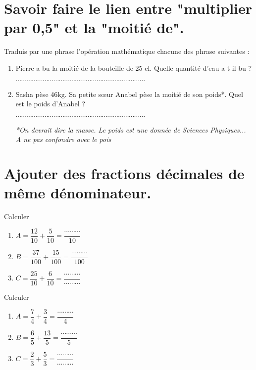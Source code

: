 \section{Savoir faire le lien entre "multiplier par 0,5" et la "moitié de".}



Traduis par une phrase l'opération mathématique chacune des phrase suivantes :
\begin{enumerate}
\item Pierre a bu la moitié de la bouteille de 25 cl. Quelle quantité d'eau a-t-il bu ?

$\cdots\cdots\cdots\cdots\cdots\cdots\cdots\cdots\cdots\cdots\cdots\cdots\cdots\cdots\cdots\cdots\cdots\cdots\cdots\cdots\cdots\cdots\cdots\cdots $

\item Sasha pèse 46kg. Sa petite sœur Anabel pèse la moitié de son poids*. Quel est le poids d'Anabel ?

$\cdots\cdots\cdots\cdots\cdots\cdots\cdots\cdots\cdots\cdots\cdots\cdots\cdots\cdots\cdots\cdots\cdots\cdots\cdots\cdots\cdots\cdots\cdots\cdots $

\textit{*On devrait dire la masse. Le poids est une donnée de Sciences Physiques... A ne pas confondre avec le pois}
\end{enumerate}



\section{Ajouter des fractions décimales de même dénominateur.}



Calculer

\begin{enumerate}
\item $A = \dfrac{12}{10} +\dfrac{5}{10} = \dfrac{\cdots\cdots\cdots }{10}  $
\item $B = \dfrac{37}{100} +\dfrac{15}{100} = \dfrac{\cdots\cdots\cdots }{100}  $
\item $C = \dfrac{25}{10} +\dfrac{6}{10} = \dfrac{\cdots\cdots\cdots }{\cdots\cdots\cdots } $
\end{enumerate}




Calculer

\begin{enumerate}
\item $A = \dfrac{7}{4} +\dfrac{3}{4} = \dfrac{\cdots\cdots\cdots }{4}  $
\item $B = \dfrac{6}{5} +\dfrac{13}{5} = \dfrac{\cdots\cdots\cdots }{5}  $
\item $C = \dfrac{2}{3} +\dfrac{5}{3} = \dfrac{\cdots\cdots\cdots }{\cdots\cdots\cdots } $
\end{enumerate}





